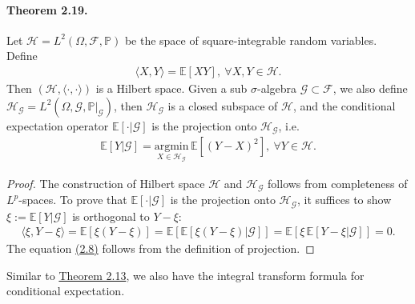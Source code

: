 \documentclass{article}
\numberwithin{equation}{section}
\newcommand{\E}{\mathbb{E}}
\renewcommand{\P}{\mathbb{P}}
\theoremstyle{plain}
\theoremstyle{definition}
\begin{document}
\paragraph{Theorem 2.19.\label{thm:2.19}} Let $\mathcal{H}=L^2(\Omega,\mathscr{F},\P)$ be the space of square-integrable random variables. Define
\begin{align*}
	\langle X,Y\rangle = \E[XY],\ \forall X,Y\in\mathcal{H}.
\end{align*}
Then $(\mathcal{H},\langle\cdot,\cdot\rangle)$ is a Hilbert space. Given a sub $\sigma$-algebra $\mathscr{G}\subset\mathscr{F}$, we also define $\mathcal{H}_\mathscr{G}=L^2(\Omega,\mathscr{G},\P|_\mathscr{G})$, then $\mathcal{H}_\mathscr{G}$ is a closed subspace of $\mathcal{H}$, and the conditional expectation operator $\E[\cdot|\mathscr{G}]$ is the projection onto $\mathcal{H}_\mathscr{G}$, i.e.
\begin{align*}
	\E[Y|\mathscr{G}] = \underset{X\in\mathcal{H}_\mathscr{G}}{\mathrm{argmin}}\,\E\left[(Y-X)^2\right],\ \forall Y\in\mathcal{H}.\tag{2.8}\label{eq:2.8}
\end{align*}
\begin{proof}
	The construction of Hilbert space $\mathcal{H}$ and $\mathcal{H}_\mathscr{G}$ follows from completeness of $L^p$-spaces. To prove that $\E[\cdot|\mathscr{G}]$ is the projection onto $\mathcal{H}_\mathscr{G}$, it suffices to show $\xi:=\E[Y|\mathscr{G}]$ is orthogonal to $Y-\xi$:
	\begin{align*}
		\langle \xi, Y-\xi\rangle = \E[\xi(Y-\xi)]=\E\left[\E[\xi(Y-\xi)|\mathscr{G}]\right]=\E\left[\xi\,\E[Y-\xi|\mathscr{G}]\right] = 0.
	\end{align*}
	The equation \hyperref[eq:2.8]{(2.8)} follows from the definition of projection.
\end{proof}

Similar to \hyperref[thm:2.13]{Theorem 2.13}, we also have the integral transform formula for conditional expectation.
\end{document}
